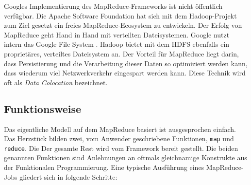 \documentclass[a4paper]{article}
\begin{document}
Googles Implementierung des MapReduce-Frameworks ist nicht öffentlich verfügbar. Die Apache Software Foundation hat sich mit dem Hadoop-Projekt zum Ziel gesetzt ein freies MapReduce-Ecosystem zu entwickeln. Der Erfolg von MapReduce geht Hand in Hand mit verteilten Dateisystemen. Google nutzt intern das Google File System \cite{GoogleFileSystem:2003}. Hadoop bietet mit dem HDFS ebenfalls ein proprietäres, verteiltes Dateisystem an. Der Vorteil für MapReduce liegt darin, dass Persistierung und die Verarbeitung dieser Daten so optimiziert werden kann, dass wiederum viel Netzwerkverkehr eingespart werden kann. Diese Technik wird oft als \textit{Data Colocation} bezeichnet.

\subsection{Funktionsweise}
\label{sec:mapreduce-operation}
Das eigentliche Modell auf dem MapReduce basiert ist ausgesprochen einfach. Das Herzstück bilden zwei, vom Anwender geschriebene Funktionen, \texttt{map} und \texttt{reduce}. Die  Der gesamte Rest wird vom Framework bereit gestellt. Die beiden genannten Funktionen sind Anlehnungen an oftmals gleichnamige Konstrukte aus der Funktionalen Programmierung. Eine typische Ausführung eines MapReduce-Jobs gliedert sich in folgende Schritte:
\end{document}
